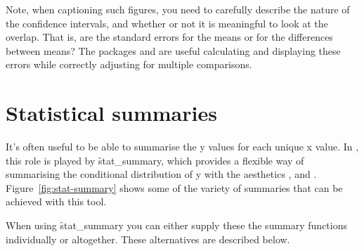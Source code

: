 % 
% 


Note, when captioning such figures, you need to carefully describe the nature of the confidence intervals, and whether or not it is meaningful to look at the overlap.  That is, are the standard errors for the means or for the differences between means?  The packages  and  are useful calculating and displaying these errors while correctly adjusting for multiple comparisons.  

% 
%

\section{Statistical summaries}
\label{sec:summary}

It's often useful to be able to summarise the y values for each unique x value.  In \ggplot, this role is played by \f{stat_summary}, which provides a flexible way of summarising the conditional distribution of y with the aesthetics  ,  and .  Figure~\ref{fig:stat-summary} shows some of the variety of summaries that can be achieved with this tool.   

When using \f{stat_summary} you can either supply these the summary functions individually or altogether.  These alternatives are described below.  

